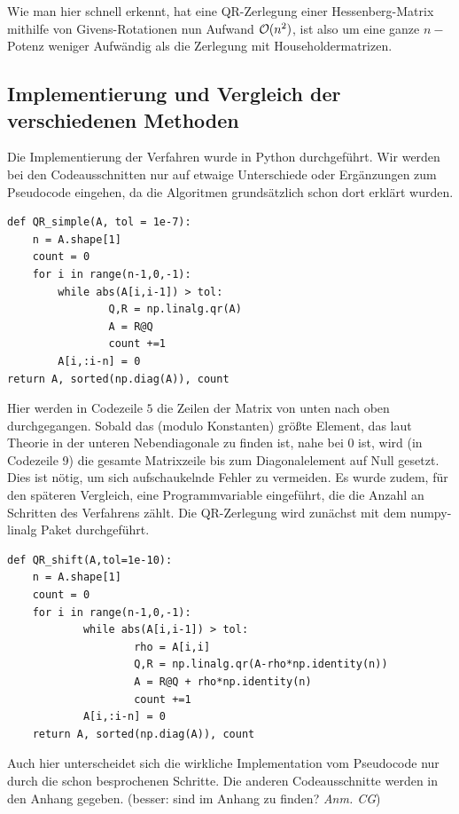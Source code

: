 \documentclass{article}
\begin{document}
Wie man hier schnell erkennt, hat eine QR-Zerlegung einer Hessenberg-Matrix mithilfe von Givens-Rotationen nun Aufwand $\mathcal{O}(n^2)$, ist also um eine ganze $n-$Potenz weniger Aufwändig als die Zerlegung mit Householdermatrizen.
\newpage
\subsection{Implementierung und Vergleich der verschiedenen Methoden}

Die Implementierung der Verfahren wurde in Python durchgeführt. Wir werden bei den Codeausschnitten nur auf etwaige Unterschiede oder Ergänzungen zum Pseudocode eingehen, da die Algoritmen grundsätzlich schon dort erklärt wurden.



\begin{lstlisting}
def QR_simple(A, tol = 1e-7):
	n = A.shape[1]
	count = 0
	for i in range(n-1,0,-1):
		while abs(A[i,i-1]) > tol:
				Q,R = np.linalg.qr(A)
				A = R@Q
				count +=1
		A[i,:i-n] = 0
return A, sorted(np.diag(A)), count
\end{lstlisting}


Hier werden in Codezeile $5$ die Zeilen der Matrix von unten nach oben durchgegangen. Sobald das (modulo Konstanten) größte Element, das laut Theorie in der unteren Nebendiagonale zu finden ist, nahe bei $0$ ist, wird (in Codezeile 9) die gesamte Matrixzeile bis zum Diagonalelement auf Null gesetzt. Dies ist nötig, um sich aufschaukelnde Fehler zu vermeiden.
Es wurde zudem, für den späteren Vergleich, eine Programmvariable eingeführt, die die Anzahl an Schritten des Verfahrens zählt. Die QR-Zerlegung wird zunächst mit dem numpy-linalg Paket durchgeführt.


\begin{lstlisting}
def QR_shift(A,tol=1e-10):
	n = A.shape[1]
	count = 0
	for i in range(n-1,0,-1):
			while abs(A[i,i-1]) > tol:
					rho = A[i,i]
					Q,R = np.linalg.qr(A-rho*np.identity(n))
					A = R@Q + rho*np.identity(n)
					count +=1
			A[i,:i-n] = 0
	return A, sorted(np.diag(A)), count
\end{lstlisting}

Auch hier unterscheidet sich die wirkliche Implementation vom Pseudocode nur durch die schon besprochenen Schritte. Die anderen Codeausschnitte werden in den Anhang gegeben. (besser: sind im Anhang zu finden? \textit{Anm. CG})
\end{document}
